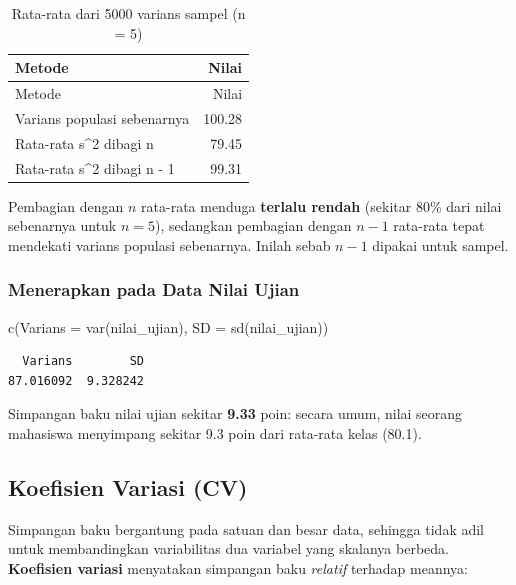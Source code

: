 \documentclass[
  indonesian,
  letterpaper,
]{book}
\newenvironment{Shaded}{\begin{snugshade}}{\end{snugshade}}
\newcommand{\AttributeTok}[1]{\textcolor[rgb]{0.40,0.45,0.13}{#1}}
\newcommand{\FunctionTok}[1]{\textcolor[rgb]{0.28,0.35,0.67}{#1}}
\newcommand{\NormalTok}[1]{\textcolor[rgb]{0.00,0.23,0.31}{#1}}
\begin{document}
\begin{longtable}[]{@{}lr@{}}
\caption{Rata-rata dari 5000 varians sampel (n = 5)}\tabularnewline
\toprule\noalign{}
Metode & Nilai \\
\midrule\noalign{}
\endfirsthead
\toprule\noalign{}
Metode & Nilai \\
\midrule\noalign{}
\endhead
\bottomrule\noalign{}
\endlastfoot
Varians populasi sebenarnya & 100.28 \\
Rata-rata s\^{}2 dibagi n & 79.45 \\
Rata-rata s\^{}2 dibagi n - 1 & 99.31 \\
\end{longtable}

Pembagian dengan \(n\) rata-rata menduga \textbf{terlalu rendah}
(sekitar 80\% dari nilai sebenarnya untuk \(n = 5\)), sedangkan
pembagian dengan \(n-1\) rata-rata tepat mendekati varians populasi
sebenarnya. Inilah sebab \(n-1\) dipakai untuk sampel.

\subsubsection{Menerapkan pada Data Nilai
Ujian}\label{menerapkan-pada-data-nilai-ujian}

\begin{Shaded}
\begin{Highlighting}[]
\FunctionTok{c}\NormalTok{(}\AttributeTok{Varians =} \FunctionTok{var}\NormalTok{(nilai\_ujian), }\AttributeTok{SD =} \FunctionTok{sd}\NormalTok{(nilai\_ujian))}
\end{Highlighting}
\end{Shaded}

\begin{verbatim}
  Varians        SD 
87.016092  9.328242 
\end{verbatim}

Simpangan baku nilai ujian sekitar \textbf{9.33} poin: secara umum,
nilai seorang mahasiswa menyimpang sekitar 9.3 poin dari rata-rata kelas
(80.1).

\subsection{Koefisien Variasi (CV)}\label{koefisien-variasi-cv}

Simpangan baku bergantung pada satuan dan besar data, sehingga tidak
adil untuk membandingkan variabilitas dua variabel yang skalanya
berbeda. \textbf{Koefisien variasi} menyatakan simpangan baku
\emph{relatif} terhadap meannya:
\end{document}
